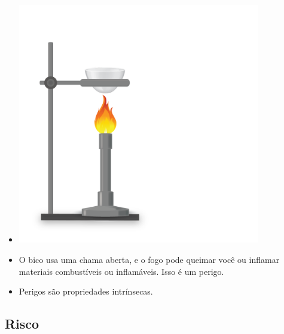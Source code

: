 \documentclass[
  letterpaper,
  DIV=11,
  numbers=noendperiod]{scrartcl}
\providecommand{\tightlist}{%
  \setlength{\itemsep}{0pt}\setlength{\parskip}{0pt}}\usepackage{longtable,booktabs,array}
\begin{document}
\begin{itemize}
\tightlist
\item
  \includegraphics[width=4.16667in,height=\textheight,keepaspectratio]{imagens/image_1.8bbab552.png}
\end{itemize}

\begin{itemize}
\tightlist
\item
  O bico usa uma chama aberta, e o fogo pode queimar você ou inflamar
  materiais combustíveis ou inflamáveis. Isso é um perigo.
\item
  Perigos são propriedades intrínsecas.
\end{itemize}

\subsection{Risco}\label{risco}
\end{document}
